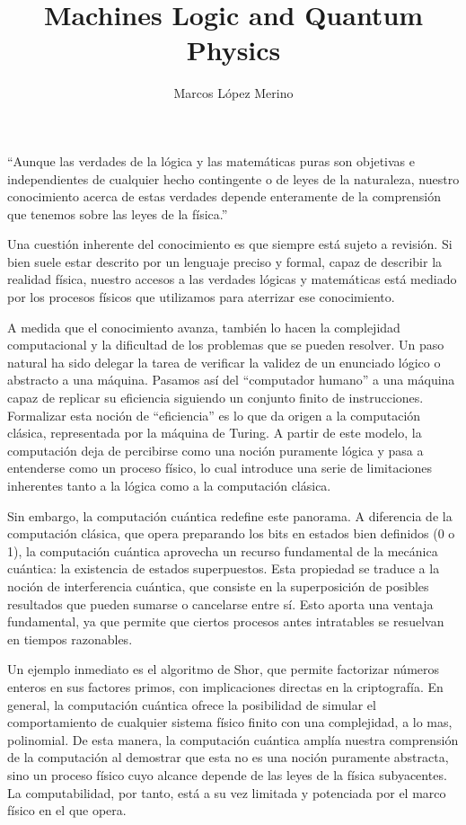 \documentclass[twoside, digital, 11pt]{fc-hw-template}
\title{Machines Logic and Quantum Physics}
\author{Marcos López Merino}
\begin{document}
\maketitle

``Aunque las verdades de la lógica y las matemáticas puras son objetivas e independientes de cualquier hecho contingente o de leyes de la naturaleza, nuestro conocimiento acerca de estas verdades depende enteramente de la comprensión que tenemos sobre las leyes de la física.''\cite{deutschMachinesLogicQuantum1999}

Una cuestión inherente del conocimiento es que siempre está sujeto a revisión. Si bien suele estar descrito por un lenguaje preciso y formal, capaz de describir la realidad física, nuestro accesos a las verdades lógicas y matemáticas está mediado por los procesos físicos que utilizamos para aterrizar ese conocimiento.

A medida que el conocimiento avanza, también lo hacen la complejidad computacional y la dificultad de los problemas que se pueden resolver. Un paso natural ha sido delegar la tarea de verificar la validez de un enunciado lógico o abstracto a una máquina. Pasamos así del ``computador humano'' a una máquina capaz de replicar su eficiencia siguiendo un conjunto finito de instrucciones. Formalizar esta noción de ``eficiencia'' es lo que da origen a la computación clásica, representada por la máquina de Turing. A partir de este modelo, la computación deja de percibirse como una noción puramente lógica y pasa a entenderse como un proceso físico, lo cual introduce una serie de limitaciones inherentes tanto a la lógica como a la computación clásica.

Sin embargo, la computación cuántica redefine este panorama. A diferencia de la computación clásica, que opera preparando los bits en estados bien definidos (0 o 1), la computación cuántica aprovecha un recurso fundamental de la mecánica cuántica: la existencia de estados superpuestos. Esta propiedad se traduce a la noción de interferencia cuántica, que consiste en la superposición de posibles resultados que pueden sumarse o cancelarse entre sí. Esto aporta una ventaja fundamental, ya que permite que ciertos procesos antes intratables se resuelvan en tiempos razonables.

Un ejemplo inmediato es el algoritmo de Shor, que permite factorizar números enteros en sus factores primos, con implicaciones directas en la criptografía. En general, la computación cuántica ofrece la posibilidad de simular el comportamiento de cualquier sistema físico finito con una complejidad, a lo mas, polinomial. De esta manera, la computación cuántica amplía nuestra comprensión de la computación al demostrar que esta no es una noción puramente abstracta, sino un proceso físico cuyo alcance depende de las leyes de la física subyacentes. La computabilidad, por tanto, está a su vez limitada y potenciada por el marco físico en el que opera.
\end{document}
